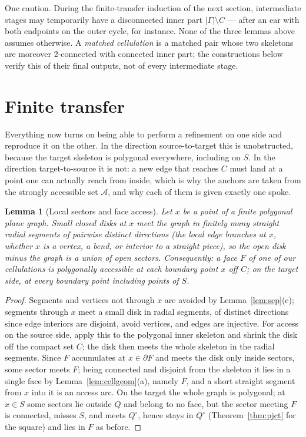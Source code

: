 \documentclass[11pt,a4paper]{article}
\theoremstyle{jsplain}
\newtheorem{lemma}[theorem]{Lemma}
\theoremstyle{jsdefn}
\begin{document}
One caution. During the finite-transfer induction of the next section,
intermediate stages may temporarily have a disconnected inner part
$|\Gamma|\setminus C$ --- after an ear with both endpoints on the outer
cycle, for instance. None of the three lemmas above assumes otherwise.
A \emph{matched cellulation} is a matched pair whose two skeletons are
moreover 2-connected with connected inner part; the constructions below
verify this of their final outputs, not of every intermediate stage.

\section{Finite transfer}\label{sec:transfer}

Everything now turns on being able to perform a refinement on one side
and reproduce it on the other. In the direction source-to-target this is
unobstructed, because the target skeleton is polygonal everywhere,
including on $S$. In the direction target-to-source it is not: a new edge
that reaches $C$ must land at a point one can actually reach from inside,
which is why the anchors are taken from the strongly accessible set $\mathcal A$,
and why each of them is given exactly one spoke.

\begin{lemma}[Local sectors and face access]\label{lem:sector}
Let $x$ be a point of a finite polygonal plane graph. Small closed
disks at $x$ meet the graph in finitely many straight radial segments
of pairwise distinct directions (the local edge branches at $x$,
whether $x$ is a vertex, a bend, or interior to a straight piece), so
the open disk minus the graph is a union of open sectors.
Consequently: a face $F$ of one of our cellulations is polygonally
accessible at each boundary point $x$ off $C$; on the target side, at
every boundary point including points of $S$.
\end{lemma}
\begin{proof}
Segments and vertices not through $x$ are avoided by
Lemma~\ref{lem:sep}(c); segments through $x$ meet a small disk in
radial segments, of distinct directions since edge interiors are
disjoint, avoid vertices, and edges are injective. For access on the
source side, apply this to the polygonal inner skeleton and
shrink the disk off the compact set $C$; the disk then meets the whole
skeleton in the radial segments. Since $F$ accumulates at
$x\in\partial F$ and meets the disk only inside sectors, some sector
meets $F$; being connected and disjoint from the skeleton it lies in a
single face by Lemma~\ref{lem:cellgeom}(a), namely $F$, and a short straight
segment from $x$ into it is an access arc. On the target the whole
graph is polygonal; at $x\in S$ some sectors lie outside $Q$ and
belong to no face, but the sector meeting $F$ is connected, misses
$S$, and meets $Q^\circ$, hence stays in $Q^\circ$
(Theorem~\ref{thm:pjct} for the square) and lies in $F$ as before.
\end{proof}
\end{document}
